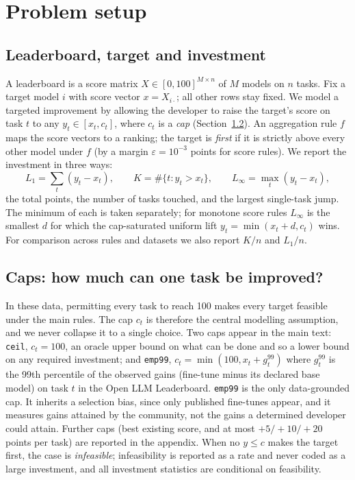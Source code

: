 \documentclass{article}
\begin{document}
\section{Problem setup}
\label{sec:setup}
\subsection{Leaderboard, target and investment}
A leaderboard is a score matrix $X\in[0,100]^{M\times n}$ of $M$ models on $n$ tasks. Fix a target model $i$ with score vector $x=X_{i\cdot}$; all other rows stay fixed. We model a targeted improvement by allowing the developer to raise the target's score on task $t$ to any $y_t\in[x_t,c_t]$, where $c_t$ is a \emph{cap} (Section~\ref{sec:caps}). An aggregation rule $f$ maps the score vectors to a ranking; the target is \emph{first} if it is strictly above every other model under $f$ (by a margin $\varepsilon=10^{-3}$ points for score rules). We report the investment in three ways:
\[
L_1=\sum_t (y_t-x_t),\qquad K=\#\{t: y_t>x_t\},\qquad L_\infty=\max_t (y_t-x_t),
\]
the total points, the number of tasks touched, and the largest single-task jump. The minimum of each is taken separately; for monotone score rules $L_\infty$ is the smallest $d$ for which the cap-saturated uniform lift $y_t=\min(x_t+d,c_t)$ wins. For comparison across rules and datasets we also report $K/n$ and $L_1/n$.

\subsection{Caps: how much can one task be improved?}
\label{sec:caps}
In these data, permitting every task to reach 100 makes every target feasible under the main rules. The cap $c_t$ is therefore the central modelling assumption, and we never collapse it to a single choice. Two caps appear in the main text: \texttt{ceil}, $c_t=100$, an oracle upper bound on what can be done and so a lower bound on any required investment; and \texttt{emp99}, $c_t=\min(100,x_t+g_t^{99})$ where $g_t^{99}$ is the 99th percentile of the observed gains (fine-tune minus its declared base model) on task $t$ in the Open LLM Leaderboard. \texttt{emp99} is the only data-grounded cap. It inherits a selection bias, since only published fine-tunes appear, and it measures gains attained by the community, not the gains a determined developer could attain. Further caps (best existing score, and at most $+5/+10/+20$ points per task) are reported in the appendix. When no $y\le c$ makes the target first, the case is \emph{infeasible}; infeasibility is reported as a rate and never coded as a large investment, and all investment statistics are conditional on feasibility.
\end{document}
